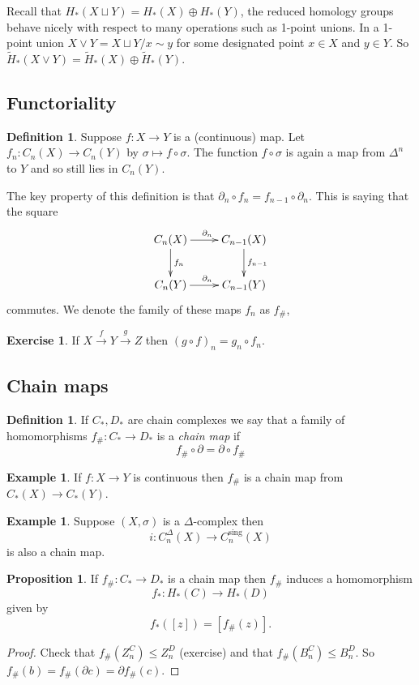 \documentclass[12pt]{article}
\theoremstyle{definition}
\newtheorem{prop}[thm]{Proposition}
\theoremstyle{definition}
\newtheorem{defn}[thm]{Definition}
\newtheorem{ex}[thm]{Example}
\newtheorem*{exer}{Exercise}
\newcommand{\C}{C_*}
\renewcommand{\H}{H_*}
\begin{document}
Recall that $\H (X\sqcup Y) = \H(X) \oplus \H(Y)$, the reduced homology groups behave nicely with respect to many operations such as 1-point unions.
In a 1-point union $X\vee Y = X\sqcup Y /x\sim y$ for some designated point $x\in X$ and $y\in Y$.
So $\tilde \H(X\vee Y) = \tilde \H(X) \oplus \tilde \H(Y)$.

\subsection{Functoriality}
\begin{defn}
Suppose $f\colon X \to Y$ is a (continuous) map.
Let $f_n\colon C_n(X) \to C_n(Y)$ by $\sigma \mapsto f\circ \sigma$.
The function $f\circ \sigma$ is again a map from $\Delta^n$ to $Y$ and so still lies in $C_n(Y)$.

The key property of this definition is that $\partial_n\circ f_n = f_{n-1}\circ \partial_n$.
This is saying that the square
\[
\xymatrix{
C_n(X)\ar[d]^{f_{n}} \ar[r]^{\partial_n} & C_{n-1}(X) \ar[d]^{f_{n-1}}\\
C_n(Y) \ar[r]^{\partial_n} & C_{n-1}(Y)\\
}
\]
commutes.
We denote the family of these maps $f_n$ as $f_\#$,
\end{defn}

\begin{exer}
If $X \xrightarrow{f} Y \xrightarrow{g} Z$ then $(g\circ f)_n = g_n \circ f_n$.
\end{exer}

\subsection{Chain maps}
\begin{defn}
If $\C, D_*$ are chain complexes we say that a family of homomorphisms $f_\#\colon \C \to D_*$ is  a \emph{chain map} if 
\[
f_\#\circ \partial = \partial \circ f_\#
\]
\end{defn}

\begin{ex}
If $f\colon X \to Y$ is continuous then $f_\#$ is a chain map from $\C (X) \to \C(Y)$.
\end{ex}
\begin{ex}
Suppose $(X,\sigma)$ is a $\Delta$-complex then 
\[
i\colon C_n^\Delta(X) \to C_n^\text{sing}(X)
\]
is also a chain map.
\end{ex}

\begin{prop}
If $f_\#\colon \C \to D_*$ is a chain map then $f_\#$ induces a homomorphism
\[
f_*\colon \H(C) \to \H(D)
\]
given by
\[
f_*([z]) = [f_\#(z)].
\]
\end{prop}
\begin{proof}
Check that $f_\#(Z_n^C) \le Z_n^D$ (exercise) and that $f_\#(B_n^C) \le B_n^D$.
So $f_\#(b) = f_\#(\partial c )  = \partial f_\#(c)$.
\end{proof}
\end{document}
